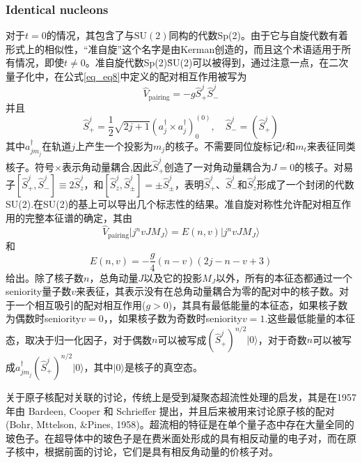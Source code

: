 \subsubsection{Identical nucleons}
对于$t=0$的情况，其包含了与$\textrm{SU}(2)$同构的代数Sp(2)。由于它与自旋代数有着形式上的相似性，“准自旋”这个名字是由Kerman创造的，而且这个术语适用于所有情况，即使$t\ne0$。准自旋代数Sp(2)\~SU(2)可以被得到，通过注意一点，在二次量子化中，在公式\ref{eq_eq8}中定义的配对相互作用被写为
\begin{equation}\label{eq_Vpair}
\widehat{V}_\textrm{pairing}=-g\widehat{S}^j_+\widehat{S}^j_-
\end{equation}
并且
\begin{equation}
\widehat{S}^j_+=\frac{1}{2}\sqrt{2j+1}(a_j^\dag\times a_j^\dag)^{(0)}_0,\quad\widehat{S}^j_-=\left(\widehat{S}^j_+\right)
\end{equation}
其中$a_{jm_j}^\dagger$在轨道$j$上产生一个投影为$m_j$的核子。不需要同位旋标记$t$和$m_t$来表征同类核子。符号$\times$表示角动量耦合,因此$\widehat{S}^j_+$创造了一对角动量耦合为$J=0$的核子。对易子$[\widehat{S}^j_+,\widehat{S}^j_-]\equiv2\widehat{S}^j_z$，和$[\widehat{S}^j_z,\widehat{S}^j_\pm]=\pm\widehat{S}^j_\pm$，表明$\widehat{S}^j_+$、$\widehat{S}^j_-$和$\widehat{S}^j_z$形成了一个封闭的代数SU(2).在SU(2)的基上可以导出几个标志性的结果。准自旋对称性允许配对相互作用的完整本征谱的确定，其由
\begin{equation}
\widehat{V}_\textrm{pairing}|j^nvJM_J\rangle=E(n,v)|j^nvJM_J\rangle
\end{equation}
和
\begin{equation}\label{eq_13}
E(n,v)=-\frac{g}{4}(n-v)(2j-n-v+3)
\end{equation}
给出。除了核子数$n$，总角动量$J$以及它的投影$M_J$以外，所有的本征态都通过一个seniority量子数$v$来表征，其表示没有在总角动量耦合为零的配对中的核子数。对于一个相互吸引的配对相互作用($g>0$)，其具有最低能量的本征态，如果核子数为偶数时seniority$v=0$，，如果核子数为奇数时seniority$v=1$.这些最低能量的本征态，取决于归一化因子，对于偶数$n$可以被写成$(\widehat{S}^j_+)^{n/2}|0\rangle$，对于奇数$n$可以被写成$a_{jm_j}^\dag(\widehat{S}^j_+)^{n/2}|0\rangle$，其中$|0\rangle$是核子的真空态。

关于原子核配对关联的讨论，传统上是受到凝聚态超流性处理的启发，其是在1957年由 Bardeen, Cooper 和 Schrieffer 提出，并且后来被用来讨论原子核的配对(Bohr, Mttelson, \&Pines, 1958)。超流相的特征是在单个量子态中存在大量全同的玻色子。在超导体中的玻色子是在费米面处形成的具有相反动量的电子对，而在原子核中，根据前面的讨论，它们是具有相反角动量的价核子对。

